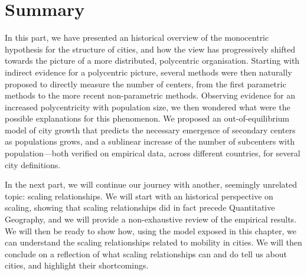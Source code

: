 \section{Summary}
\label{sec:summary}

In this part, we have presented an historical overview of the monocentric
hypothesis for the structure of cities, and how the view has progressively
shifted towards the picture of a more distributed, polycentric organisation.
Starting with indirect evidence for a polycentric picture, several methods were
then naturally proposed to directly measure the number of centers, from the
first parametric methods to the more recent non-parametric methods. Observing
evidence for an increased polycentricity with population size, we then wondered
what were the possible explanations for this phenomenon. We proposed an
out-of-equilibrium model of city growth that predicts the necessary emergence of
secondary centers as populations grows, and a sublinear increase of the number
of subcenters with population---both verified on empirical data, across
different countries, for several city definitions.

In the next part, we will continue our journey with another, seemingly unrelated
topic: scaling relationships. We will start with an historical perspective on
scaling, showing that scaling relationships did in fact precede Quantitative
Geography, and we will provide a non-exhaustive review of the empirical results.
We will then be ready to show how, using the model exposed in this chapter, we
can understand the scaling relationships related to mobility in cities. We will
then conclude on a reflection of what scaling relationships can and do tell us
about cities, and highlight their shortcomings.
